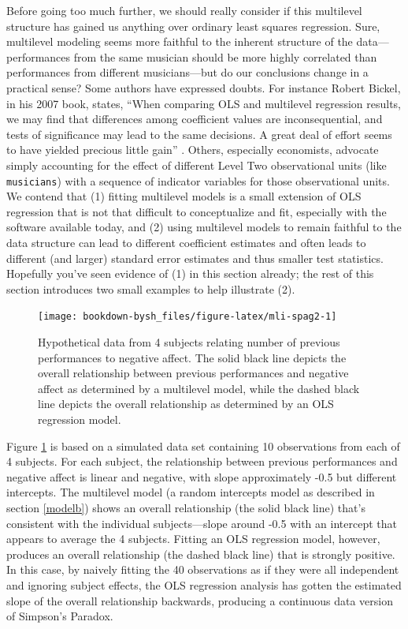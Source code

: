 \documentclass[
]{krantz}
\begin{document}
Before going too much further, we should really consider if this multilevel structure has gained us anything over ordinary least squares regression. Sure, multilevel modeling seems more faithful to the inherent structure of the data---performances from the same musician should be more highly correlated than performances from different musicians---but do our conclusions change in a practical sense? Some authors have expressed doubts. For instance Robert Bickel, in his 2007 book, states, ``When comparing OLS and multilevel regression results, we may find that differences among coefficient values are inconsequential, and tests of significance may lead to the same decisions. A great deal of effort seems to have yielded precious little gain'' \citep{Bickel2007}. Others, especially economists, advocate simply accounting for the effect of different Level Two observational units (like \texttt{musicians}) with a sequence of indicator variables for those observational units. We contend that (1) fitting multilevel models is a small extension of OLS regression that is not that difficult to conceptualize and fit, especially with the software available today, and (2) using multilevel models to remain faithful to the data structure can lead to different coefficient estimates and often leads to different (and larger) standard error estimates and thus smaller test statistics. Hopefully you've seen evidence of (1) in this section already; the rest of this section introduces two small examples to help illustrate (2).

\begin{figure}

{\centering \texttt{[image: bookdown-bysh\_files/figure-latex/mli-spag2-1]} 

}

\caption{Hypothetical data from 4 subjects relating number of previous performances to negative affect.  The solid black line depicts the overall relationship between previous performances and negative affect as determined by a multilevel model, while the dashed black line depicts the overall relationship as determined by an OLS regression model.}\label{fig:mli-spag2}
\end{figure}

Figure \ref{fig:mli-spag2} is based on a simulated data set containing 10 observations from each of 4 subjects. For each subject, the relationship between previous performances and negative affect is linear and negative, with slope approximately -0.5 but different intercepts. The multilevel model (a random intercepts model as described in section \ref{modelb}) shows an overall relationship (the solid black line) that's consistent with the individual subjects---slope around -0.5 with an intercept that appears to average the 4 subjects. Fitting an OLS regression model, however, produces an overall relationship (the dashed black line) that is strongly positive. In this case, by naively fitting the 40 observations as if they were all independent and ignoring subject effects, the OLS regression analysis has gotten the estimated slope of the overall relationship backwards, producing a continuous data version of Simpson's Paradox.
\end{document}
